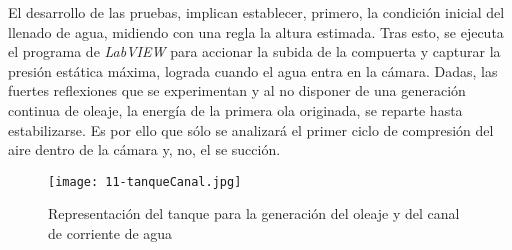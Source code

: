 El desarrollo de las pruebas, implican establecer, primero, la condición
inicial del llenado de agua, midiendo con una regla la altura estimada.
Tras esto, se ejecuta el programa de \emph{LabVIEW} para accionar la
subida de la compuerta y capturar la presión estática máxima, lograda
cuando el agua entra en la cámara. Dadas, las fuertes reflexiones que se
experimentan y al no disponer de una generación continua de oleaje, la
energía de la primera ola originada, se reparte hasta estabilizarse. Es
por ello que sólo se analizará el primer ciclo de compresión del aire
dentro de la cámara y, no, el se succión.

\begin{figure}[t]
  \centering
  \texttt{[image: 11-tanqueCanal.jpg]}
  \caption[Representación del tanque y del canal]{Representación del tanque para la generación del oleaje y del canal de corriente de agua}
  \label{fig:tanqueCanal}
  \end{figure}